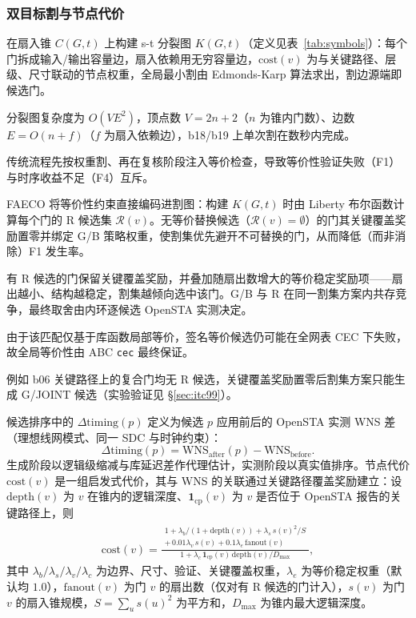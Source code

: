 \documentclass[journal]{IEEEtran}
\begin{document}
\subsubsection{双目标割与节点代价}
在扇入锥 $C(G, t)$ 上构建 s-t 分裂图 $K(G, t)$（定义见表~\ref{tab:symbols}）：每个门拆成输入/输出容量边，扇入依赖用无穷容量边，$\mathrm{cost}(v)$ 为与关键路径、层级、尺寸联动的节点权重，全局最小割由 Edmonds-Karp 算法求出，割边源端即候选门。

分裂图复杂度为 $O(VE^2)$，顶点数 $V=2n+2$（$n$ 为锥内门数）、边数 $E=O(n+f)$（$f$ 为扇入依赖边），b18/b19 上单次割在数秒内完成。

传统流程先按权重割、再在复核阶段注入等价检查，导致等价性验证失败（F1）与时序收益不足（F4）互斥。

FAECO 将等价性约束直接编码进割图：构建 $K(G, t)$ 时由 Liberty 布尔函数计算每个门的 R 候选集 $\mathcal{R}(v)$。无等价替换候选（$\mathcal{R}(v)=\emptyset$）的门其关键覆盖奖励置零并绑定 G/B 策略权重，使割集优先避开不可替换的门，从而降低（而非消除）F1 发生率。

有 R 候选的门保留关键覆盖奖励，并叠加随扇出数增大的等价稳定奖励项——扇出越小、结构越稳定，割集越倾向选中该门。G/B 与 R 在同一割集方案内共存竞争，最终取舍由内环逐候选 OpenSTA 实测决定。

由于该匹配仅基于库函数局部等价，签名等价候选仍可能在全网表 CEC 下失败，故全局等价性由 ABC \texttt{cec} 最终保证。

例如 b06 关键路径上的复合门均无 R 候选，关键覆盖奖励置零后割集方案只能生成 G/JOINT 候选（实验验证见 \S\ref{sec:itc99}）。

候选排序中的 $\Delta\mathrm{timing}(p)$ 定义为候选 $p$ 应用前后的 OpenSTA 实测 WNS 差（理想线网模式、同一 SDC 与时钟约束）：
\begin{equation}\label{eq:dtiming}
\Delta\mathrm{timing}(p) = \mathrm{WNS}_{\mathrm{after}}(p) - \mathrm{WNS}_{\mathrm{before}}.
\end{equation}
生成阶段以逻辑级缩减与库延迟差作代理估计，实测阶段以真实值排序。节点代价 $\mathrm{cost}(v)$ 是一组启发式代价，其与 WNS 的关联通过关键路径覆盖奖励建立：设 $\mathrm{depth}(v)$ 为 $v$ 在锥内的逻辑深度、$\mathbf{1}_{\mathrm{cp}}(v)$ 为 $v$ 是否位于 OpenSTA 报告的关键路径上，则
{\small
\begin{equation}
\label{eq:cost}
\begin{split}
\mathrm{cost}(v) = \frac{\substack{1 + \lambda_b/(1+\mathrm{depth}(v)) + \lambda_s\,s(v)^2/S \\ +\, 0.01\lambda_v\,s(v) + 0.1\lambda_e\,\mathrm{fanout}(v)}}{1 + \lambda_c\,\mathbf{1}_{\mathrm{cp}}(v)\,\mathrm{depth}(v)/D_{\max}},
\end{split}
\end{equation}
}
其中 $\lambda_b/\lambda_s/\lambda_v/\lambda_c$ 为边界、尺寸、验证、关键覆盖权重，$\lambda_e$ 为等价稳定权重（默认均 $1.0$），$\mathrm{fanout}(v)$ 为门 $v$ 的扇出数（仅对有 R 候选的门计入），$s(v)$ 为门 $v$ 的扇入锥规模，$S=\sum_u s(u)^2$ 为平方和，$D_{\max}$ 为锥内最大逻辑深度。
\end{document}
